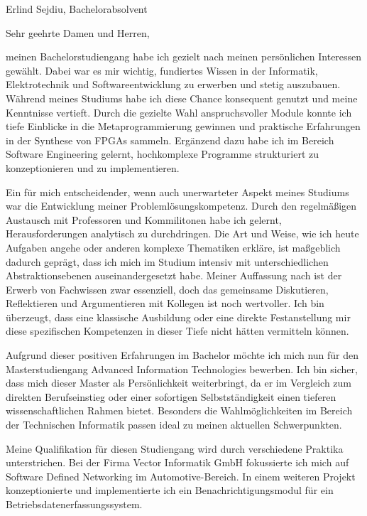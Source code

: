 \documentclass[a4paper, 10pt]{letter}
\begin{document}
\begin{letter}
{
    Erlind Sejdiu, Bachelorabsolvent
}

\opening{Sehr geehrte Damen und Herren,}

meinen Bachelorstudiengang habe ich gezielt nach meinen persönlichen Interessen gewählt. Dabei war es mir wichtig, fundiertes Wissen in der Informatik, Elektrotechnik und Softwareentwicklung zu erwerben und stetig auszubauen. Während meines Studiums habe ich diese Chance konsequent genutzt und meine Kenntnisse vertieft. Durch die gezielte Wahl anspruchsvoller Module konnte ich tiefe Einblicke in die Metaprogrammierung gewinnen und praktische Erfahrungen in der Synthese von FPGAs sammeln. Ergänzend dazu habe ich im Bereich Software Engineering gelernt, hochkomplexe Programme strukturiert zu konzeptionieren und zu implementieren.

Ein für mich entscheidender, wenn auch unerwarteter Aspekt meines Studiums war die Entwicklung meiner Problemlösungskompetenz. Durch den regelmäßigen Austausch mit Professoren und Kommilitonen habe ich gelernt, Herausforderungen analytisch zu durchdringen. Die Art und Weise, wie ich heute Aufgaben angehe oder anderen komplexe Thematiken erkläre, ist maßgeblich dadurch geprägt, dass ich mich im Studium intensiv mit unterschiedlichen Abstraktionsebenen auseinandergesetzt habe. Meiner Auffassung nach ist der Erwerb von Fachwissen zwar essenziell, doch das gemeinsame Diskutieren, Reflektieren und Argumentieren mit Kollegen ist noch wertvoller. Ich bin überzeugt, dass eine klassische Ausbildung oder eine direkte Festanstellung mir diese spezifischen Kompetenzen in dieser Tiefe nicht hätten vermitteln können.

Aufgrund dieser positiven Erfahrungen im Bachelor möchte ich mich nun für den Masterstudiengang Advanced Information Technologies bewerben. Ich bin sicher, dass mich dieser Master als Persönlichkeit weiterbringt, da er im Vergleich zum direkten Berufseinstieg oder einer sofortigen Selbstständigkeit einen tieferen wissenschaftlichen Rahmen bietet. Besonders die Wahlmöglichkeiten im Bereich der Technischen Informatik passen ideal zu meinen aktuellen Schwerpunkten.

Meine Qualifikation für diesen Studiengang wird durch verschiedene Praktika unterstrichen. Bei der Firma Vector Informatik GmbH fokussierte ich mich auf Software Defined Networking im Automotive-Bereich. In einem weiteren Projekt konzeptionierte und implementierte ich ein Benachrichtigungsmodul für ein Betriebsdatenerfassungssystem.


\end{letter}
\end{document}
